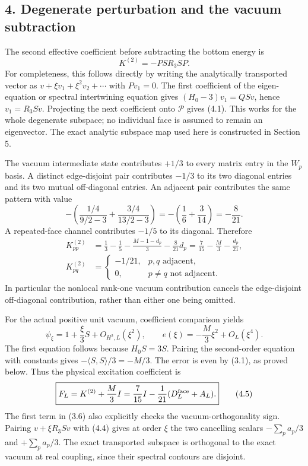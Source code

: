 \documentclass[
  11pt,
]{article}
\begin{document}
\subsection{4. Degenerate perturbation and the vacuum
subtraction}\label{magnetic-part-5-degenerate-perturbation-and-the-vacuum-subtraction}

The second effective coefficient before subtracting the bottom energy is
\[
 K^{(2)}=-PSR_3SP.
\tag{4.1}
\] For completeness, this follows directly by writing the analytically
transported vector as \(v+\xi v_1+\xi^2v_2+\cdots\) with \(Pv_1=0\). The
first coefficient of the eigen-equation or spectral intertwining
equation gives \((H_0-3)v_1=QSv\), hence \(v_1=R_3Sv\). Projecting the
next coefficient onto \(\mathcal P\) gives (4.1). This works for the
whole degenerate subspace; no individual face is assumed to remain an
eigenvector. The exact analytic subspace map used here is constructed in
Section 5.

The vacuum intermediate state contributes \(+1/3\) to every matrix entry
in the \(W_p\) basis. A distinct edge-disjoint pair contributes \(-1/3\)
to its two diagonal entries and its two mutual off-diagonal entries. An
adjacent pair contributes the same pattern with value \[
 -\left(\frac{1/4}{9/2-3}+\frac{3/4}{13/2-3}\right)
       =-\left(\frac16+\frac3{14}\right)=-\frac8{21}.
\tag{4.2}
\] A repeated-face channel contributes \(-1/5\) to its diagonal.
Therefore \[
 \begin{split}
 K^{(2)}_{pp}
  &=\frac13-\frac15-\frac{M-1-d_p}{3}-\frac8{21}d_p
    =\frac7{15}-\frac M3-\frac{d_p}{21},\\
 K^{(2)}_{pq}
  &=\begin{cases}-1/21,&p,q\text{ adjacent},\\0,&p\ne q\text{ not adjacent}.
    \end{cases}
 \end{split}
\tag{4.3}
\] In particular the nonlocal rank-one vacuum contribution cancels the
edge-disjoint off-diagonal contribution, rather than either one being
omitted.

For the actual positive unit vacuum, coefficient comparison yields \[
 \psi_\xi=1+\frac\xi3S+O_{H^2,L}(\xi^2),\qquad
 e(\xi)=-\frac M3\xi^2+O_L(\xi^4).
\tag{4.4}
\] The first equation follows because \(H_0S=3S\). Pairing the
second-order equation with constants gives
\(-\langle S,S\rangle/3=-M/3\). The error is even by (3.1), as proved
below. Thus the physical excitation coefficient is \[
 \boxed{F_L=K^{(2)}+\frac M3I
          =\frac7{15}I-\frac1{21}(D_L^{\rm face}+A_L).}
\tag{4.5}
\] The first term in (3.6) also explicitly checks the
vacuum-orthogonality sign. Pairing \(v+\xi R_3Sv\) with (4.4) gives at
order \(\xi\) the two cancelling scalars \(-\sum_pa_p/3\) and
\(+\sum_pa_p/3\). The exact transported subspace is orthogonal to the
exact vacuum at real coupling, since their spectral contours are
disjoint.
\end{document}
